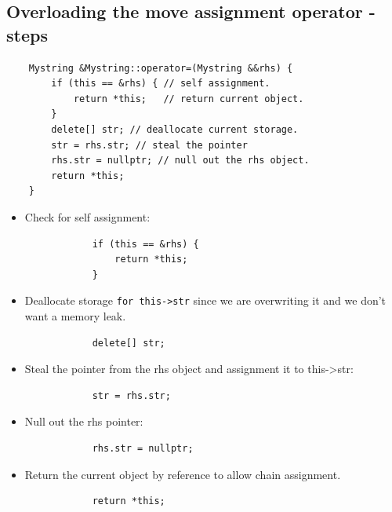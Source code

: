 \subsection{Overloading the move assignment operator - steps}
\begin{verbatim}
    Mystring &Mystring::operator=(Mystring &&rhs) {
        if (this == &rhs) { // self assignment.
            return *this;   // return current object.
        }
        delete[] str; // deallocate current storage.
        str = rhs.str; // steal the pointer
        rhs.str = nullptr; // null out the rhs object.
        return *this; 
    }
\end{verbatim}
\begin{itemize}
    \item Check for self assignment:
        \begin{verbatim}
            if (this == &rhs) {
                return *this;
            }
        \end{verbatim}
    
    \item Deallocate storage \texttt{for this->str} since we are overwriting it and we don't want a memory leak.
        \begin{verbatim}
            delete[] str;
        \end{verbatim}
    
    \item Steal the pointer from the rhs object and assignment it to this->str:
        \begin{verbatim}
            str = rhs.str;
        \end{verbatim}
    
    \item Null out the rhs pointer:
        \begin{verbatim}
            rhs.str = nullptr;
        \end{verbatim}
    
    \item Return the current object by reference to allow chain assignment.
        \begin{verbatim}
            return *this;
        \end{verbatim}
\end{itemize}

